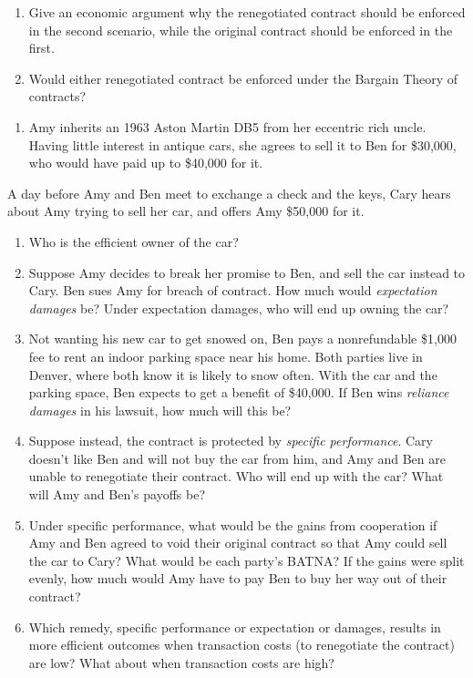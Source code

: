 \documentclass[
  11pt,
]{article}
\providecommand{\tightlist}{%
  \setlength{\itemsep}{0pt}\setlength{\parskip}{0pt}}
\begin{document}
\begin{enumerate}
\def\labelenumi{\alph{enumi}.}
\tightlist
\item
  Give an economic argument why the renegotiated contract should be
  enforced in the second scenario, while the original contract should be
  enforced in the first.
\item
  Would either renegotiated contract be enforced under the Bargain
  Theory of contracts?
\end{enumerate}

\clearpage

\begin{enumerate}
\def\labelenumi{\arabic{enumi}.}
\setcounter{enumi}{6}
\tightlist
\item
  Amy inherits an 1963 Aston Martin DB5 from her eccentric rich uncle.
  Having little interest in antique cars, she agrees to sell it to Ben
  for \$30,000, who would have paid up to \$40,000 for it.
\end{enumerate}

A day before Amy and Ben meet to exchange a check and the keys, Cary
hears about Amy trying to sell her car, and offers Amy \$50,000 for it.

\begin{enumerate}
\def\labelenumi{\alph{enumi}.}
\tightlist
\item
  Who is the efficient owner of the car?
\item
  Suppose Amy decides to break her promise to Ben, and sell the car
  instead to Cary. Ben sues Amy for breach of contract. How much would
  \emph{expectation damages} be? Under expectation damages, who will end
  up owning the car?
\item
  Not wanting his new car to get snowed on, Ben pays a nonrefundable
  \$1,000 fee to rent an indoor parking space near his home. Both
  parties live in Denver, where both know it is likely to snow often.
  With the car and the parking space, Ben expects to get a benefit of
  \$40,000. If Ben wins \emph{reliance damages} in his lawsuit, how much
  will this be?
\item
  Suppose instead, the contract is protected by \emph{specific
  performance}. Cary doesn't like Ben and will not buy the car from him,
  and Amy and Ben are unable to renegotiate their contract. Who will end
  up with the car? What will Amy and Ben's payoffs be?
\item
  Under specific performance, what would be the gains from cooperation
  if Amy and Ben agreed to void their original contract so that Amy
  could sell the car to Cary? What would be each party's BATNA? If the
  gains were split evenly, how much would Amy have to pay Ben to buy her
  way out of their contract?
\item
  Which remedy, specific performance or expectation or damages, results
  in more efficient outcomes when transaction costs (to renegotiate the
  contract) are low? What about when transaction costs are high?
\end{enumerate}
\end{document}
